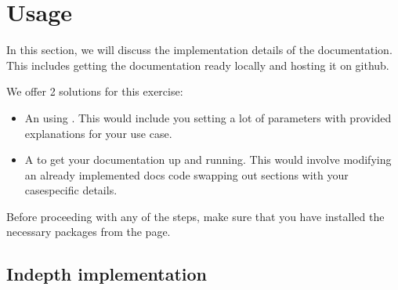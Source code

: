 \documentclass[letterpaper,10pt,english]{sphinxmanual}
\begin{document}
\sphinxstepscope


\chapter{Usage}
\label{\detokenize{usage:usage}}\label{\detokenize{usage::doc}}
\sphinxAtStartPar
In this section, we will discuss the implementation details of the documentation.
This includes getting the documentation ready locally and hosting it on github.

\sphinxAtStartPar
We offer 2 solutions for this exercise:
\begin{itemize}
\item {} 
\sphinxAtStartPar
An {\hyperref[\detokenize{usage:in-depth-implementation}]{}} using .
This would include you setting a lot of parameters with provided explanations for your use case.

\sphinxAtStartPar
{}

\item {} 
\sphinxAtStartPar
A {\hyperref[\detokenize{usage:quick-and-dirty-implementation}]{}} to get your documentation up and running.
This would involve modifying an already implemented docs code swapping out sections with your case\sphinxhyphen{}specific details.

\sphinxAtStartPar
{}

\end{itemize}

\sphinxAtStartPar
Before proceeding with any of the steps, make sure that you have installed the necessary packages from the {\hyperref[\detokenize{installation::doc}]{}} page.


\section{In\sphinxhyphen{}depth implementation}
\label{\detokenize{usage:in-depth-implementation}}
\end{document}
